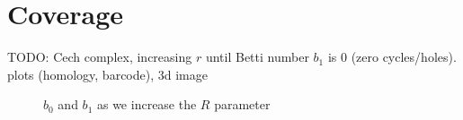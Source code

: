 \documentclass[a4paper, 12pt]{article}
\begin{document}
\section{Coverage}
TODO: Cech complex, increasing $r$ until Betti number $b_1$ is 0 (zero cycles/holes). plots (homology, barcode), 3d image

\begin{figure}[H]
        \centering
        \caption{$b_0$ and $b_1$ as we increase the $R$ parameter}
\end{figure}
\end{document}
